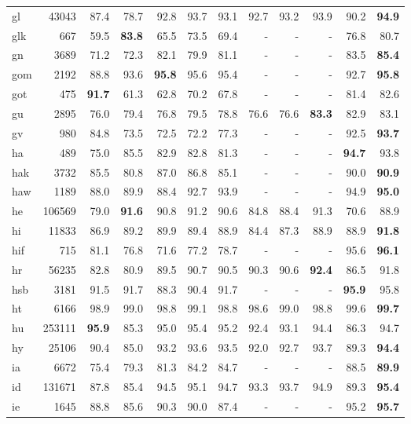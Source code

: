 \documentclass[11pt,a4paper]{article}
\begin{document}
\begin{supertabular}{lrrr|rrr|rrr|rr}
gl & 43043 & 87.4 & 78.7 & 92.8 & 93.7 & 93.1 & 92.7 & 93.2 & 93.9 & 90.2 & \textbf{94.9}\\
glk & 667 & 59.5 & \textbf{83.8} & 65.5 & 73.5 & 69.4 & - & - & - & 76.8 & 80.7\\
gn & 3689 & 71.2 & 72.3 & 82.1 & 79.9 & 81.1 & - & - & - & 83.5 & \textbf{85.4}\\
gom & 2192 & 88.8 & 93.6 & \textbf{95.8} & 95.6 & 95.4 & - & - & - & 92.7 & \textbf{95.8}\\
got & 475 & \textbf{91.7} & 61.3 & 62.8 & 70.2 & 67.8 & - & - & - & 81.4 & 82.6\\
gu & 2895 & 76.0 & 79.4 & 76.8 & 79.5 & 78.8 & 76.6 & 76.6 & \textbf{83.3} & 82.9 & 83.1\\
gv & 980 & 84.8 & 73.5 & 72.5 & 72.2 & 77.3 & - & - & - & 92.5 & \textbf{93.7}\\
ha & 489 & 75.0 & 85.5 & 82.9 & 82.8 & 81.3 & - & - & - & \textbf{94.7} & 93.8\\
hak & 3732 & 85.5 & 80.8 & 87.0 & 86.8 & 85.1 & - & - & - & 90.0 & \textbf{90.9}\\
haw & 1189 & 88.0 & 89.9 & 88.4 & 92.7 & 93.9 & - & - & - & 94.9 & \textbf{95.0}\\
he & 106569 & 79.0 & \textbf{91.6} & 90.8 & 91.2 & 90.6 & 84.8 & 88.4 & 91.3 & 70.6 & 88.9\\
hi & 11833 & 86.9 & 89.2 & 89.9 & 89.4 & 88.9 & 84.4 & 87.3 & 88.9 & 88.9 & \textbf{91.8}\\
hif & 715 & 81.1 & 76.8 & 71.6 & 77.2 & 78.7 & - & - & - & 95.6 & \textbf{96.1}\\
hr & 56235 & 82.8 & 80.9 & 89.5 & 90.7 & 90.5 & 90.3 & 90.6 & \textbf{92.4} & 86.5 & 91.8\\
hsb & 3181 & 91.5 & 91.7 & 88.3 & 90.4 & 91.7 & - & - & - & \textbf{95.9} & 95.8\\
ht & 6166 & 98.9 & 99.0 & 98.8 & 99.1 & 98.8 & 98.6 & 99.0 & 98.8 & 99.6 & \textbf{99.7}\\
hu & 253111 & \textbf{95.9} & 85.3 & 95.0 & 95.4 & 95.2 & 92.4 & 93.1 & 94.4 & 86.3 & 94.7\\
hy & 25106 & 90.4 & 85.0 & 93.2 & 93.6 & 93.5 & 92.0 & 92.7 & 93.7 & 89.3 & \textbf{94.4}\\
ia & 6672 & 75.4 & 79.3 & 81.3 & 84.2 & 84.7 & - & - & - & 88.5 & \textbf{89.9}\\
id & 131671 & 87.8 & 85.4 & 94.5 & 95.1 & 94.7 & 93.3 & 93.7 & 94.9 & 89.3 & \textbf{95.4}\\
ie & 1645 & 88.8 & 85.6 & 90.3 & 90.0 & 87.4 & - & - & - & 95.2 & \textbf{95.7}\\

\end{supertabular}
\end{document}
